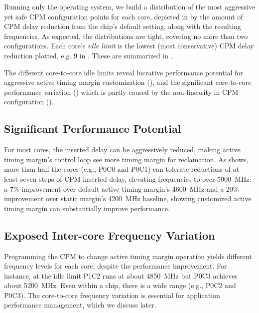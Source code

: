 Running only the operating system, we build a distribution of the most aggressive yet safe CPM configuration points for each core, depicted in  by the amount of CPM delay reduction from the chip's default setting, along with the resulting frequencies. As expected, the distributions are tight, covering no more than two configurations. Each core's \textit{idle limit} is the lowest (most conservative) CPM delay reduction plotted, e.g. 9 in . These are summarized in . 



The different core-to-core idle limits reveal lucrative performance potential for aggressive active timing margin customization (), and the significant core-to-core performance variation () which is partly caused by the non-linearity in CPM configuration ().



\subsection{Significant Performance Potential}
\label{sec:process:idle:potential}

For most cores, the inserted delay can be aggressively reduced, making active timing margin's control loop see more timing margin for reclamation. As  shows, more than half the cores (e.g., P0C0 and P0C1) can tolerate reductions of at least seven steps of CPM inserted delay, elevating frequencies to over 5000~MHz: a 7\% improvement over default active timing margin's 4600~MHz and a 20\% improvement over static margin's 4200~MHz baseline, showing customized active timing margin can substantially improve performance.

\subsection{Exposed Inter-core Frequency Variation}
\label{sec:process:idle:heterogeneity}

Programming the CPM to change active timing margin operation yields different frequency levels for each core, despite the performance improvement. For instance, at the idle limit P1C2 runs at about 4850~MHz but P0C3 achieves about 5200~MHz. Even within a chip, there is a wide range (e.g., P0C2 and P0C3). The core-to-core frequency variation is essential for application performance management, which we discuss later.

